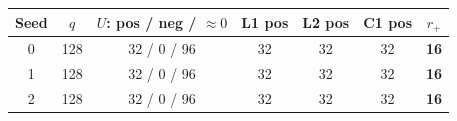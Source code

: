 \begin{tabular}{@{}ccccccc@{}}
\toprule
Seed & $q$ & $U$: pos / neg / $\approx 0$ & L1 pos & L2 pos & C1 pos & $r_+$ \\
\midrule
0 & 128 & 32 / 0 / 96 & 32 & 32 & 32 & \textbf{16} \\
1 & 128 & 32 / 0 / 96 & 32 & 32 & 32 & \textbf{16} \\
2 & 128 & 32 / 0 / 96 & 32 & 32 & 32 & \textbf{16} \\
\bottomrule
\end{tabular}
